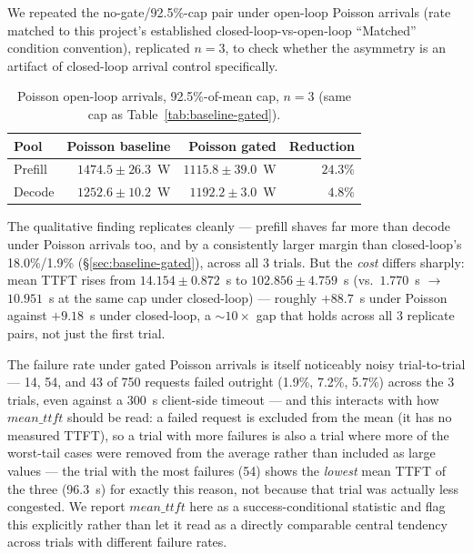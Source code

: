 \documentclass[sigconf,review,anonymous]{acmart}
\begin{document}
We repeated the no-gate/92.5\%-cap pair under open-loop Poisson arrivals (rate matched to
this project's established closed-loop-vs-open-loop ``Matched'' condition convention),
replicated $n{=}3$, to check whether the asymmetry is an artifact of closed-loop arrival
control specifically.

\begin{table}[t]
  \caption{Poisson open-loop arrivals, 92.5\%-of-mean cap, $n{=}3$ (same cap as
    Table~\ref{tab:baseline-gated}).}
  \label{tab:poisson}
  \footnotesize
  \begin{tabular}{@{}lrrr@{}}
    \toprule
    Pool & Poisson baseline & Poisson gated & Reduction \\
    \midrule
    Prefill & $1474.5{\pm}26.3$~W & $1115.8{\pm}39.0$~W & $\mathbf{24.3\%}$ \\
    Decode  & $1252.6{\pm}10.2$~W & $1192.2{\pm}3.0$~W  & $\mathbf{4.8\%}$ \\
    \bottomrule
  \end{tabular}
\end{table}

The qualitative finding replicates cleanly --- prefill shaves far more than decode under
Poisson arrivals too, and by a consistently larger margin than closed-loop's 18.0\%/1.9\%
(\S\ref{sec:baseline-gated}), across all 3 trials. But the \emph{cost} differs sharply: mean
TTFT rises from $14.154{\pm}0.872$~s to $102.856{\pm}4.759$~s (vs.\ $1.770$~s
$\rightarrow$ $10.951$~s at the same cap under closed-loop) --- roughly $+88.7$~s under
Poisson against $+9.18$~s under closed-loop, a ${\sim}10\times$ gap that holds across all 3
replicate pairs, not just the first trial.

The failure rate under gated Poisson arrivals is itself noticeably noisy trial-to-trial ---
14, 54, and 43 of 750 requests failed outright (1.9\%, 7.2\%, 5.7\%) across the 3 trials, even
against a 300~s client-side timeout --- and this interacts with how $\mathit{mean\_ttft}$
should be read: a failed request is excluded from the mean (it has no measured TTFT), so a
trial with more failures is also a trial where more of the worst-tail cases were removed from
the average rather than included as large values --- the trial with the most failures (54)
shows the \emph{lowest} mean TTFT of the three (96.3~s) for exactly this reason, not because
that trial was actually less congested. We report $\mathit{mean\_ttft}$ here as a
success-conditional statistic and flag this explicitly rather than let it read as a directly
comparable central tendency across trials with different failure rates.
\end{document}
